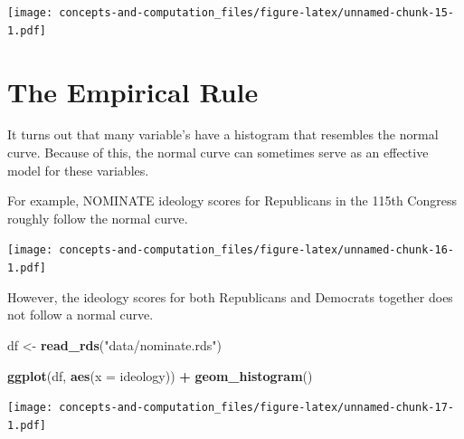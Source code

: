 \documentclass[]{book}
\newenvironment{Shaded}{\begin{snugshade}}{\end{snugshade}}
\newcommand{\DataTypeTok}[1]{\textcolor[rgb]{0.13,0.29,0.53}{#1}}
\newcommand{\DecValTok}[1]{\textcolor[rgb]{0.00,0.00,0.81}{#1}}
\newcommand{\KeywordTok}[1]{\textcolor[rgb]{0.13,0.29,0.53}{\textbf{#1}}}
\newcommand{\NormalTok}[1]{#1}
\newcommand{\OperatorTok}[1]{\textcolor[rgb]{0.81,0.36,0.00}{\textbf{#1}}}
\newcommand{\StringTok}[1]{\textcolor[rgb]{0.31,0.60,0.02}{#1}}
\begin{document}
\texttt{[image: concepts-and-computation\_files/figure-latex/unnamed-chunk-15-1.pdf]}

\hypertarget{the-empirical-rule}{%
\section{The Empirical Rule}\label{the-empirical-rule}}

It turns out that many variable's have a histogram that resembles the normal curve. Because of this, the normal curve can sometimes serve as an effective model for these variables.

For example, NOMINATE ideology scores for Republicans in the 115th Congress roughly follow the normal curve.

\begin{Shaded}
\end{Shaded}

\texttt{[image: concepts-and-computation\_files/figure-latex/unnamed-chunk-16-1.pdf]}

However, the ideology scores for both Republicans and Democrats together does not follow a normal curve.

\begin{Shaded}
\begin{Highlighting}[]
\NormalTok{df <-}\StringTok{ }\KeywordTok{read_rds}\NormalTok{(}\StringTok{"data/nominate.rds"}\NormalTok{)}

\KeywordTok{ggplot}\NormalTok{(df, }\KeywordTok{aes}\NormalTok{(}\DataTypeTok{x =}\NormalTok{ ideology)) }\OperatorTok{+}\StringTok{ }
\StringTok{  }\KeywordTok{geom_histogram}\NormalTok{() }
\end{Highlighting}
\end{Shaded}

\texttt{[image: concepts-and-computation\_files/figure-latex/unnamed-chunk-17-1.pdf]}
\end{document}
